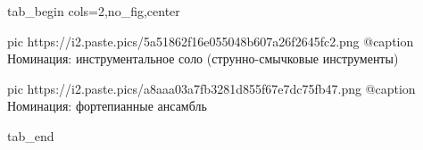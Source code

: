  
 
 
 
 


\ifcmt
  tab_begin cols=2,no_fig,center

     pic https://i2.paste.pics/5a51862f16e055048b607a26f2645fc2.png
		 @caption Номинация: инструментальное соло (струнно-смычковые инструменты) 

		 pic https://i2.paste.pics/a8aaa03a7fb3281d855f67e7dc75fb47.png
		 @caption Номинация: фортепианные ансамбль 

  tab_end
\fi
